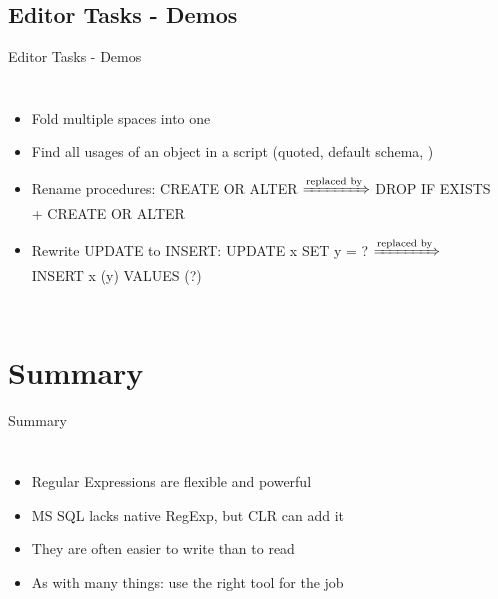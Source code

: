 \documentclass[english,aspectratio=169]{beamer}
\begin{document}
\subsection{Editor Tasks - Demos}
\begin{frame}{Editor Tasks - Demos}
\begin{columns}
        \begin{itemize}
        \item Fold multiple spaces into one
        \item Find all usages of an object in a script (quoted, default schema, \textellipsis)
        \item Rename procedures: CREATE OR ALTER $\xRightarrow{\text{replaced by}}$ DROP IF EXISTS + CREATE OR ALTER
        \item Rewrite UPDATE to INSERT: UPDATE x SET y = ? $\xRightarrow{\text{replaced by}}$ INSERT x (y) VALUES (?)
        \end{itemize}
        \begin{center}
        \end{center}
\end{columns}
\end{frame}

\section{Summary}

\begin{frame}{Summary}
\begin{columns}
    \begin{itemize}
        \item Regular Expressions are flexible and powerful
        \item MS SQL lacks native RegExp, but CLR can add it
        \item They are often easier to write than to read
        \item As with many things: use the right tool for the job
    \end{itemize}
        \begin{center}
\\\cite{comicHowToRegex}
        \end{center}
\end{columns}
\end{frame}
\end{document}
